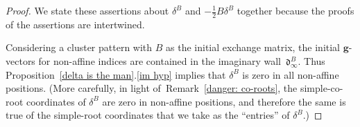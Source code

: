 \documentclass{amsart}
\theoremstyle{definition}
\theoremstyle{remark}
\numberwithin{equation}{section}
\newcommand{\0}{{\mathbf{0}}}
\newcommand{\g}{\mathbf{g}}
\renewcommand{\d}{{\mathfrak d}}
\begin{document}
\begin{proof}
We state these assertions about $\delta^B$ and $-\frac12B\delta^B$ together because the proofs of the assertions are intertwined.

Considering a cluster pattern with $B$ as the initial exchange matrix, the initial $\g$-vectors for non-affine indices are contained in the imaginary wall~$\d^B_\infty$.
Thus Proposition~\ref{delta is the man}.\ref{im hyp} implies that $\delta^B$ is zero in all non-affine positions.
  (More carefully, in light of~Remark~\ref{danger: co-roots}, the simple-co-root coordinates of $\delta^B$ are zero in non-affine positions, and therefore the same is true of the simple-root coordinates that we take as the ``entries'' of $\delta^B$.) 


\end{proof}
\end{document}
